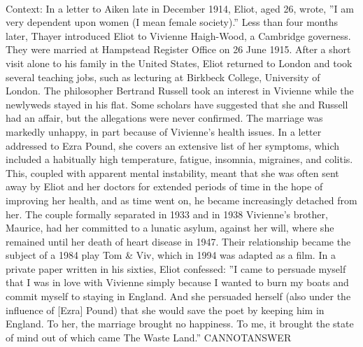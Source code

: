 \documentclass[11pt,a4paper, onecolumn]{article}
\begin{document}
\\ Context: In a letter to Aiken late in December 1914, Eliot, aged 26, wrote, ''I am very dependent upon women (I mean female society).'' Less than four months later, Thayer introduced Eliot to Vivienne Haigh-Wood, a Cambridge governess. They were married at Hampstead Register Office on 26 June 1915. After a short visit alone to his family in the United States, Eliot returned to London and took several teaching jobs, such as lecturing at Birkbeck College, University of London. The philosopher Bertrand Russell took an interest in Vivienne while the newlyweds stayed in his flat. Some scholars have suggested that she and Russell had an affair, but the allegations were never confirmed. The marriage was markedly unhappy, in part because of Vivienne's health issues. In a letter addressed to Ezra Pound, she covers an extensive list of her symptoms, which included a habitually high temperature, fatigue, insomnia, migraines, and colitis. This, coupled with apparent mental instability, meant that she was often sent away by Eliot and her doctors for extended periods of time in the hope of improving her health, and as time went on, he became increasingly detached from her. The couple formally separated in 1933 and in 1938 Vivienne's brother, Maurice, had her committed to a lunatic asylum, against her will, where she remained until her death of heart disease in 1947. Their relationship became the subject of a 1984 play Tom & Viv, which in 1994 was adapted as a film. In a private paper written in his sixties, Eliot confessed: ''I came to persuade myself that I was in love with Vivienne simply because I wanted to burn my boats and commit myself to staying in England. And she persuaded herself (also under the influence of [Ezra] Pound) that she would save the poet by keeping him in England. To her, the marriage brought no happiness. To me, it brought the state of mind out of which came The Waste Land.'' CANNOTANSWER
\end{document}
